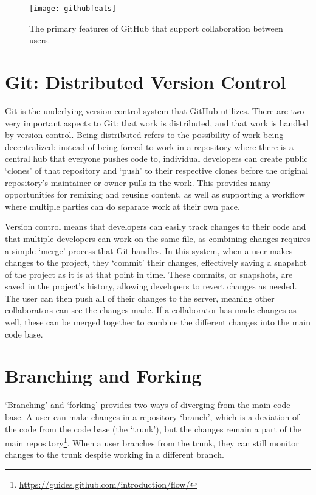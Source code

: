 \begin{figure}[h!]
 \caption{The primary features of GitHub that support collaboration between users.}
 \centering
   \texttt{[image: githubfeats]}
 \label{fig:githubfeats}
\end{figure}

\section{Git: Distributed Version Control}
Git is the underlying version control system that GitHub utilizes. There are two very important aspects to Git: that work is distributed, and that work is handled by version control. Being distributed refers to the possibility of work being decentralized: instead of being forced to work in a repository where there is a central hub that everyone pushes code to, individual developers can create public `clones' of that repository and `push' to their respective clones before the original repository's maintainer or owner pulls in the work. This provides many opportunities for remixing and reusing content, as well as supporting a workflow where multiple parties can do separate work at their own pace.

Version control means that developers can easily track changes to their code and that multiple developers can work on the same file, as combining changes requires a simple `merge' process that Git handles. In this system, when a user makes changes to the project, they `commit' their changes, effectively saving a snapshot of the project as it is at that point in time. These commits, or snapshots, are saved in the project's history, allowing developers to revert changes as needed. The user can then push all of their changes to the server, meaning other collaborators can see the changes made. If a collaborator has made changes as well, these can be merged together to combine the different changes into the main code base.

\section{Branching and Forking}
`Branching' and `forking' provides two ways of diverging from the main code base. A user can make changes in a repository `branch', which is a deviation of the code from the code base (the `trunk'), but the changes remain a part of the main repository\footnote{\url{https://guides.github.com/introduction/flow/}}. When a user branches from the trunk, they can still monitor changes to the trunk despite working in a different branch.

